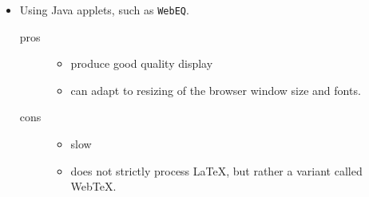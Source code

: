 \documentclass[landscape, headrule, footrule]{foils}
\begin{document}
\begin{itemize}
  \item Using Java applets, such as \texttt{WebEQ}.
\begin{description}
  \item[pros]\quad
\begin{itemize}
  \item produce good quality display
  \item can adapt to resizing of the browser window size and fonts.
\end{itemize}

  \item[cons] \quad
\begin{itemize}
  \item slow
  \item does not strictly process \LaTeX, but rather a variant called WebTeX.
\end{itemize}
\end{description}
\end{itemize}

%
\end{document}
